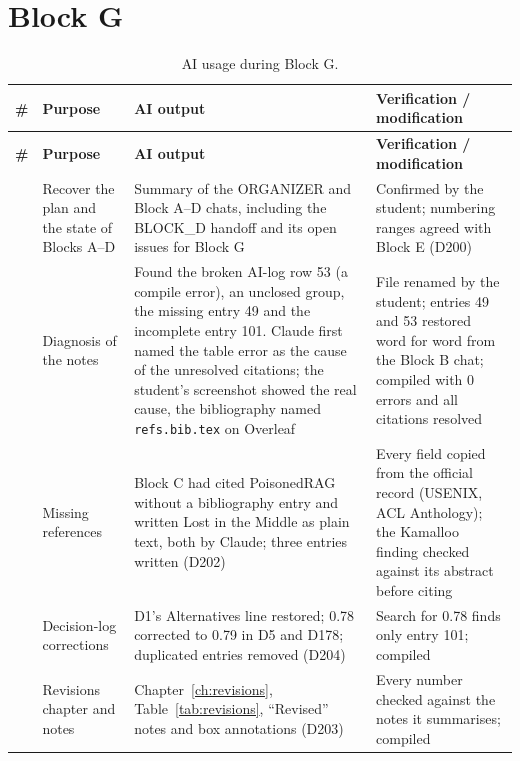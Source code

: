 \documentclass[11pt,a4paper]{report}
\begin{document}
\section{Block G}\label{sec:ailog-g}

{\small
\renewcommand{\arraystretch}{1.25}
\begin{longtable}{
  >{\raggedright\arraybackslash}p{0.6cm}
  >{\raggedright\arraybackslash}p{4.4cm}
  >{\raggedright\arraybackslash}p{4.4cm}
  >{\raggedright\arraybackslash}p{4.8cm}}
\caption{AI usage during Block G.}\label{tab:ailog-g}\\
\toprule
\textbf{\#} & \textbf{Purpose} & \textbf{AI output} & \textbf{Verification / modification} \\
\midrule
\endfirsthead
\toprule
\textbf{\#} & \textbf{Purpose} & \textbf{AI output} & \textbf{Verification / modification} \\
\midrule
\endhead
\bottomrule
\endfoot
130 & Recover the plan and the state of Blocks A--D
  & Summary of the ORGANIZER and Block A--D chats, including the BLOCK\_D
    handoff and its open issues for Block G
  & Confirmed by the student; numbering ranges agreed with Block E (D200) \\
131 & Diagnosis of the notes
  & Found the broken AI-log row 53 (a compile error), an unclosed group, the
    missing entry 49 and the incomplete entry 101. Claude first named the
    table error as the cause of the unresolved citations; the student's
    screenshot showed the real cause, the bibliography named
    \texttt{refs.bib.tex} on Overleaf
  & File renamed by the student; entries 49 and 53 restored word for word
    from the Block B chat; compiled with 0 errors and all citations
    resolved \\
132 & Missing references
  & Block C had cited PoisonedRAG without a bibliography entry and written
    Lost in the Middle as plain text, both by Claude; three entries written
    (D202)
  & Every field copied from the official record (USENIX, ACL Anthology); the
    Kamalloo finding checked against its abstract before citing \\
133 & Decision-log corrections
  & D1's Alternatives line restored; 0.78 corrected to 0.79 in D5 and D178;
    duplicated entries removed (D204)
  & Search for 0.78 finds only entry 101; compiled \\
134 & Revisions chapter and notes
  & Chapter~\ref{ch:revisions}, Table~\ref{tab:revisions}, ``Revised'' notes
    and box annotations (D203)
  & Every number checked against the notes it summarises; compiled \\

\end{longtable}}
\end{document}
